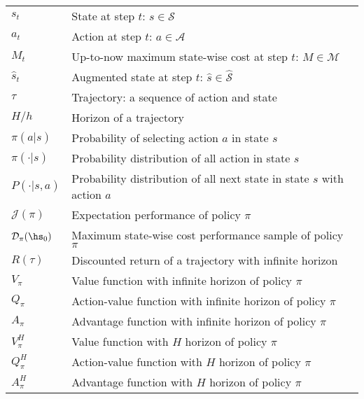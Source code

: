 \begin{table}[H]
\begin{tabular}{p{2cm} p{13cm}}
        $s_t$  & State at step $t$:  $s\in\mathcal{S}$  \\
        $a_t$  & Action at step $t$:  $a\in\mathcal{A}$ \\
        $M_t$  & Up-to-now maximum state-wise cost at step $t$:  $M\in\mathcal{M}$ \\
        $\hat{s}_t$  & Augmented state at step $t$:  $\hat{s}\in\hat{\mathcal{S}}$  \\
        $\tau$  & Trajectory: a sequence of action and state  \\
        $H / h$  & Horizon of a trajectory  \\
        $\pi(a|s)$  & Probability of selecting action $a$ in state $s$ \\
        $\pi(\cdot | s)$ & Probability distribution of all action in state $s$\\
        $P(\cdot|s, a)$ & Probability distribution of all next state in state $s$ with action $a$\\
        $\mathcal{J}(\pi)$ & Expectation performance of policy $\pi$\\
        $\mathcal{D}_{\pi}(\hs_0)$ & Maximum state-wise cost performance sample of policy $\pi$ \\
        $R(\tau)$ & Discounted return of a trajectory with infinite horizon \\
        $V_\pi$ & Value function with infinite horizon of policy $\pi$\\
        $Q_\pi$ & Action-value function with infinite horizon of policy $\pi$\\
        $A_\pi$ & Advantage function with infinite horizon of policy $\pi$\\
        $V^H_\pi$ & Value function with $H$ horizon of policy $\pi$\\
        $Q^H_\pi$ & Action-value function with $H$ horizon of policy $\pi$\\
        $A^H_\pi$ & Advantage function with $H$ horizon of policy $\pi$\\
        
        \bottomrule
    \end{tabular}
\end{table}


